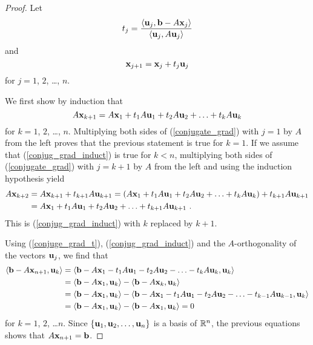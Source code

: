 \begin{proof}
Let
\begin{equation}\label{conjuge_grad_t}
t_j =
\frac{\left\langle{\mathbf{u}_j} , {\mathbf{b} - A\mathbf{x}_j}\right\rangle}{\left\langle{\mathbf{u}_j} , {A\mathbf{u}_j}\right\rangle}
\end{equation}
and
\begin{equation}\label{conjugate_grad}
\mathbf{x}_{j+1} = \mathbf{x}_j + t_j \mathbf{u}_j
\end{equation}
for $j=1$, $2$, \ldots, $n$.

We first show by induction that
\begin{equation}\label{conjug_grad_induct}
A\mathbf{x}_{k+1} = A\mathbf{x}_1 + t_1 A\mathbf{u}_1 + t_2 A\mathbf{u}_2 +
\ldots + t_k A\mathbf{u}_k
\end{equation}
for $k=1$, $2$, \ldots, $n$.
Multiplying both sides of (\ref{conjugate_grad}) with $j=1$ by $A$
from the left proves that the previous statement is true for $k=1$.
If we assume that (\ref{conjug_grad_induct}) is true for $k < n$,
multiplying both sides of (\ref{conjugate_grad}) with $j=k+1$ by $A$
from the left and using the induction hypothesis yield
\begin{align*}
A\mathbf{x}_{k+2} &= A\mathbf{x}_{k+1} + t_{k+1} A\mathbf{u}_{k+1}
= \left( A\mathbf{x}_1 + t_1 A\mathbf{u}_1 + t_2 A\mathbf{u}_2 +
\ldots + t_k A\mathbf{u}_k \right) + t_{k+1} A\mathbf{u}_{k+1} \\
&= A\mathbf{x}_1 + t_1 A\mathbf{u}_1 + t_2 A\mathbf{u}_2 +
\ldots + t_{k+1} A\mathbf{u}_{k+1} \ .
\end{align*}
This is (\ref{conjug_grad_induct}) with $k$ replaced by $k+1$.

Using (\ref{conjuge_grad_t}), (\ref{conjug_grad_induct}) and the
$A$-orthogonality of the vectors $\mathbf{u}_j$, we find that
\begin{align*}
\left\langle{\mathbf{b} - A \mathbf{x}_{n+1}} , {\mathbf{u}_k}\right\rangle &=
\left\langle{\mathbf{b} - A\mathbf{x}_1 - t_1 A\mathbf{u}_1 - t_2 A\mathbf{u}_2 -
\ldots - t_k A\mathbf{u}_k} , {\mathbf{u}_k}\right\rangle \\
&= \left\langle{\mathbf{b} - A\mathbf{x}_1} , {\mathbf{u}_k}\right\rangle
- \left\langle{\mathbf{b}- A\mathbf{x}_k} , {\mathbf{u}_k}\right\rangle \\
&= \left\langle{\mathbf{b} - A\mathbf{x}_1} , {\mathbf{u}_k}\right\rangle -
\left\langle{\mathbf{b} - A\mathbf{x}_1 - t_1 A\mathbf{u}_1 - t_2 A\mathbf{u}_2 -
\ldots - t_{k-1} A\mathbf{u}_{k-1}} , {\mathbf{u}_k}\right\rangle \\
&= \left\langle{\mathbf{b} - A\mathbf{x}_1} , {\mathbf{u}_k}\right\rangle - \left\langle{\mathbf{b} - A\mathbf{x}_1} , {\mathbf{u}_k}\right\rangle
= 0
\end{align*}
for $k=1$, $2$, \ldots $n$.  Since
$\{\mathbf{u}_1, \mathbf{u}_2, \ldots, \mathbf{u}_n\}$ is a basis of
$\mathbb{R}^n$, the previous equations shows that $A \mathbf{x}_{n+1} = \mathbf{b}$.
\end{proof}

